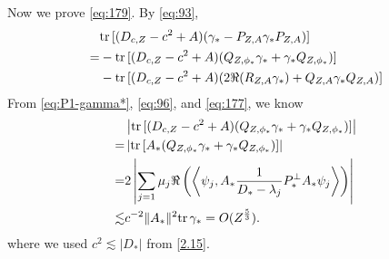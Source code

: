 \documentclass[a4paper]{amsart}
\def\tr{{\rm tr \,}}
\begin{document}
Now we prove \eqref{eq:179}. By \eqref{eq:93},
\begin{equation}\label{eq:182}
    \begin{split}
      &\tr[(D_{c,Z}-c^2+A) (\gamma_*-P_{Z,A}\gamma_*P_{Z,A})]\\
      =&- \tr[(D_{c,Z}-c^2+A)(Q_{Z,\phi_*}\gamma_*+\gamma_*Q_{Z,\phi_*})]\\
      &-\tr[(D_{c,Z}-c^2+A) (2\Re (R_{Z,A}\gamma_*)+Q_{Z,A}\gamma_*Q_{Z,A})]
    \end{split}
\end{equation}
From \eqref{eq:P1-gamma*}, \eqref{eq:96}, and \eqref{eq:177}, we know
\begin{equation}\label{eq:183}
    \begin{split}
      &\left|\tr[(D_{c,Z}-c^2+A) (Q_{Z,\phi_*}\gamma_*+\gamma_*Q_{Z,\phi_*})]\right|\\
      =&\left|\tr[A_* (Q_{Z,\phi_*}\gamma_*+\gamma_*Q_{Z,\phi_*})]\right|\\
      =&2\left|\sum_{j=1}\mu_j\Re\left(\left<\psi_j, A_*  \frac{1}{D_*-\lambda_j}P_*^\perp A_* \psi_j\right>\right)\right|\\
      \lesssim& c^{-2}\|A_*\|^2\tr\gamma_*=O(Z^\frac53).
    \end{split}
\end{equation}
where we used $c^2 \lesssim |D_*|$ from
\eqref{2.15}.
\end{document}

